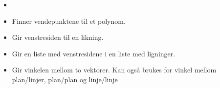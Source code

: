 \begin{itemize}
\item {}

\item {}
{Finner vendepunktene til et polynom.}

\item {}
{Gir venstresiden til en likning.}

\item {}
{Gir en liste med venstresidene i en liste med ligninger.}

\item {}
{Gir vinkelen mellom to vektorer. Kan også brukes for vinkel mellom plan/linjer, plan/plan og linje/linje}
\end{itemize}
\label{commandlistend}









\regsin

\retn

\skalar



\summ



\trikomb

\vektor

\vekpro

\vend


